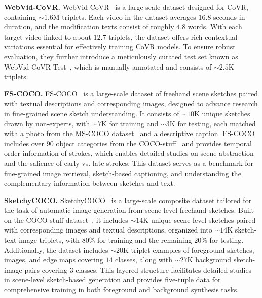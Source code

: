 \textbf{WebVid-CoVR.}
WebVid-CoVR~\cite{ventura2024covr} is a large-scale dataset designed for CoVR, containing $\sim1.6$M triplets. Each video in the dataset averages $16.8$ seconds in duration, and the modification texts consist of roughly $4.8$ words. With each target video linked to about $12.7$ triplets, the dataset offers rich contextual variations essential for effectively training CoVR models. To ensure robust evaluation, they further introduce a meticulously curated test set known as WebVid-CoVR-Test~\cite{ventura2024covr}, which is manually annotated and consists of $\sim2.5$K triplets. 






\textbf{FS-COCO.} FS-COCO~\cite{chowdhury2022fscoco} is a large-scale dataset of freehand scene sketches paired with textual descriptions and corresponding images, designed to advance research in fine-grained scene sketch understanding. It consists of $\sim10$K unique sketches drawn by non-experts, with $\sim7$K for training and $\sim3$K for testing, each matched with a photo from the MS-COCO dataset~\cite{lin2014microsoft} and a descriptive caption. 
FS-COCO includes over $90$ object categories from the COCO-stuff~\cite{caesar2018coco} and provides temporal order information of strokes, which enables detailed studies on scene abstraction and the salience of early vs. late strokes. This dataset serves as a benchmark for fine-grained image retrieval, sketch-based captioning, and understanding the complementary information between sketches and text.

\textbf{SketchyCOCO.} SketchyCOCO~\cite{gao2020sketchcoco} is a large-scale composite dataset tailored for the task of automatic image generation from scene-level freehand sketches. Built on the COCO-stuff dataset~\cite{caesar2018coco}, it includes $\sim14$K unique scene-level sketches paired with corresponding images and textual descriptions, organized into $\sim14$K  sketch-text-image triplets, with $80$\% for training and the remaining $20$\% for testing. Additionally, the dataset includes $\sim20$K triplet examples of foreground sketches, images, and edge maps covering $14$ classes, along with $\sim27$K background sketch-image pairs covering $3$ classes. This layered structure facilitates detailed studies in scene-level sketch-based generation and provides five-tuple data for comprehensive training in both foreground and background synthesis tasks.


